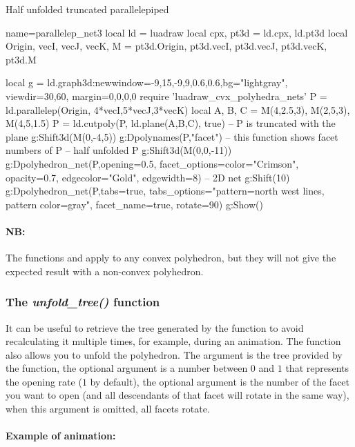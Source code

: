 \begin{demo}{Half unfolded truncated parallelepiped}
\begin{luadraw}{name=parallelep_net3}
local ld = luadraw
local cpx, pt3d = ld.cpx, ld.pt3d
local Origin, vecI, vecJ, vecK, M = pt3d.Origin, pt3d.vecI, pt3d.vecJ, pt3d.vecK, pt3d.M

local g = ld.graph3d:new{window={-9,15,-9,9,0.6,0.6},bg="lightgray", viewdir={30,60}, margin={0,0,0,0}} 
require 'luadraw_cvx_polyhedra_nets'
P = ld.parallelep(Origin, 4*vecI,5*vecJ,3*vecK)
local A, B, C = M(4,2.5,3), M(2,5,3), M(4,5,1.5)
P = ld.cutpoly(P, ld.plane(A,B,C), true) -- P is truncated with the plane
g:Shift3d(M(0,-4,5))
g:Dpolynames(P,"facet") -- this function shows facet numbers of P
-- half unfolded P
g:Shift3d(M(0,0,-11))
g:Dpolyhedron_net(P,{opening=0.5, facet_options={color="Crimson", opacity=0.7, edgecolor="Gold", edgewidth=8}})
-- 2D net
g:Shift(10)
g:Dpolyhedron_net(P,{tabs=true, tabs_options="pattern=north west lines, pattern color=gray", 
 facet_name=true, rotate=90})
g:Show()
\end{luadraw}
\end{demo}

\paragraph{NB:} The functions  and  apply to any convex polyhedron, but they will not give the expected result with a non-convex polyhedron.

\subsubsection{The \emph{unfold\_tree()} function}

It can be useful to retrieve the tree generated by the  function to avoid recalculating it multiple times, for example, during an animation. The  function also allows you to unfold the polyhedron. The argument  is the tree provided by the  function, the optional argument  is a number between $0$ and $1$ that represents the opening rate ($1$ by default), the optional argument  is the number of the facet you want to open (and all descendants of that facet will rotate in the same way), when this argument is omitted, all facets rotate.


\paragraph{Example of animation:}

